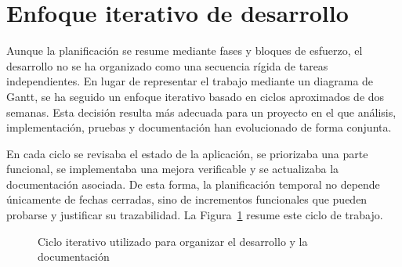 \section{Enfoque iterativo de desarrollo}

Aunque la planificación se resume mediante fases y bloques de esfuerzo, el desarrollo no se ha organizado como una secuencia rígida de tareas independientes. En lugar de representar el trabajo mediante un diagrama de Gantt, se ha seguido un enfoque iterativo basado en ciclos aproximados de dos semanas. Esta decisión resulta más adecuada para un proyecto en el que análisis, implementación, pruebas y documentación han evolucionado de forma conjunta.

En cada ciclo se revisaba el estado de la aplicación, se priorizaba una parte funcional, se implementaba una mejora verificable y se actualizaba la documentación asociada. De esta forma, la planificación temporal no depende únicamente de fechas cerradas, sino de incrementos funcionales que pueden probarse y justificar su trazabilidad. La Figura~\ref{fig:ciclo-iterativo-planificacion} resume este ciclo de trabajo.

\begin{figure}[htbp]
    \centering
    \caption{Ciclo iterativo utilizado para organizar el desarrollo y la documentación}
    \label{fig:ciclo-iterativo-planificacion}
\end{figure}
\FloatBarrier

